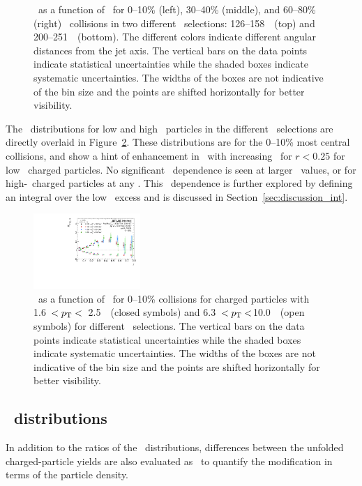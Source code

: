 \begin{figure}[h]
{\begin{tabular}{ccc}
\end{tabular}}
\caption{\RDptr\ as a function of \pt\ for  0--10\% (left), 30--40\% (middle), and 60--80\% (right) \PbPb\ collisions in two different \ptjet\ selections: 126--158~\GeV\ (top) and 200--251~\GeV\ (bottom).
The different colors indicate different angular distances from the jet axis.
The vertical bars on the data points indicate statistical uncertainties while the shaded boxes indicate systematic uncertainties.
The widths of the boxes are not indicative of the bin size and the points are shifted horizontally for better visibility.}
\label{fig:pttrkdep}
\end{figure}


The \RDptr\ distributions for low and high \pt\ particles in the different \ptjet\ selections are directly overlaid in Figure~\ref{fig:ptjetdep}.
These distributions are for the 0--10\% most central collisions, and show a hint of enhancement in \RDptr\ with increasing \ptjet\  for $r < 0.25$ for low  \pt\ charged particles.
No significant \ptjet\ dependence is seen at larger \rvar\ values, or for high-\pt\ charged particles at any \rvar.
This \ptjet\ dependence is further explored by defining an integral over the low \pt\ excess and is discussed in Section~\ref{sec:discussion_int}.

\begin{figure}[ht]
\centerline{
\includegraphics[width=0.36\textwidth]{figures/main/results/RDpT_dR_trk3_trk6_cent0}}
\caption{\RDptr\ as a function of \rvar\ for 0--10\% collisions for charged particles with 1.6~$< \mbox{$p_{\mathrm{T}}$} <$~2.5~\GeV\ (closed symbols) and 6.3~$< \mbox{$p_{\mathrm{T}}$} <$10.0~\GeV\ (open symbols) for different \ptjet\ selections.
The vertical bars on the data points indicate statistical uncertainties while the shaded boxes indicate systematic uncertainties.
The widths of the boxes are not indicative of the bin size and the points are shifted horizontally for better visibility.}
\label{fig:ptjetdep}
\end{figure}



\subsection{\DeltaDptr\ distributions}
\label{sec:delta_dptr}
In addition to the ratios of the \Dptr\ distributions, differences between the unfolded charged-particle yields are also evaluated as \DeltaDptr\ to quantify the modification in terms of the particle density.

